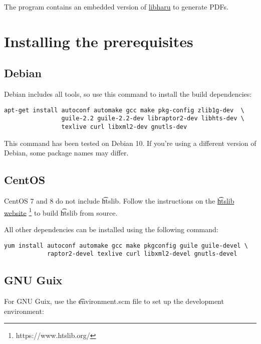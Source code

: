   The  program contains an embedded version of
  \href{https://github.com/libharu/libharu}{libharu} to generate PDFs.

\section{Installing the prerequisites}

\subsection{Debian}

  Debian includes all tools, so use this command to install the
  build dependencies:

\begin{siderules}
\begin{verbatim}
apt-get install autoconf automake gcc make pkg-config zlib1g-dev  \
                guile-2.2 guile-2.2-dev libraptor2-dev libhts-dev \
                texlive curl libxml2-dev gnutls-dev
\end{verbatim}
\end{siderules}

  This command has been tested on Debian 10.  If you're using a different
  version of Debian, some package names may differ.

\subsection{CentOS}

  CentOS 7 and 8 do not include \t{htslib}.  Follow the instructions on
  the \href{https://www.htslib.org/}{\t{htslib} website}%
  \footnote{https://www.htslib.org/} to build \t{htslib} from source.

  All other dependencies can be installed using the following command:

\begin{siderules}
\begin{verbatim}
yum install autoconf automake gcc make pkgconfig guile guile-devel \
            raptor2-devel texlive curl libxml2-devel gnutls-devel
\end{verbatim}
\end{siderules}

\subsection{GNU Guix}

  For GNU Guix, use the \t{environment.scm} file to set up the development
  environment:

